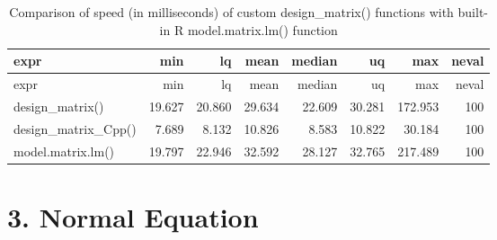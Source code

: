 \documentclass[
]{article}
\begin{document}
\begin{longtable}[]{@{}lrrrrrrr@{}}
\caption{Comparison of speed (in milliseconds) of custom
design\_matrix() functions with built-in R model.matrix.lm()
function}\tabularnewline
\toprule
expr & min & lq & mean & median & uq & max & neval\tabularnewline
\midrule
\endfirsthead
\toprule
expr & min & lq & mean & median & uq & max & neval\tabularnewline
\midrule
\endhead
design\_matrix() & 19.627 & 20.860 & 29.634 & 22.609 & 30.281 & 172.953
& 100\tabularnewline
design\_matrix\_Cpp() & 7.689 & 8.132 & 10.826 & 8.583 & 10.822 & 30.184
& 100\tabularnewline
model.matrix.lm() & 19.797 & 22.946 & 32.592 & 28.127 & 32.765 & 217.489
& 100\tabularnewline
\bottomrule
\end{longtable}

\hypertarget{normal-equation}{%
\section{3. Normal Equation}\label{normal-equation}}
\end{document}
